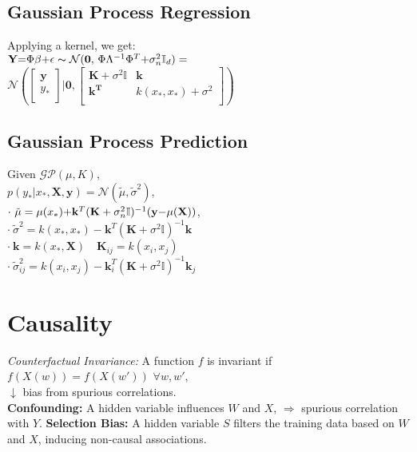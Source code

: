 \subsection*{Gaussian Process Regression}
Applying a kernel, we get: \\
$\mathbf{Y} {=} \Phi \mathbb{\beta} {+} \mathbb{\epsilon} \thicksim \mathcal{N}(\mathbf{0},\,\Phi \Lambda^{-1}\Phi^T {+} \sigma_n^2\mathbb{I}_{d}) = $
$\mathcal{N}(\begin{bmatrix}
\mathbf{y}\\
y_*\\
\end{bmatrix}|\mathbf{0},\begin{bmatrix}
    \mathbf{K}+\sigma^2\mathbb{I} & \mathbf{k} \\
    \mathbf{k^T} & k(x_*,x_*) + \sigma^2\\
\end{bmatrix})$\\

\subsection*{Gaussian Process Prediction}
Given $\mathcal{GP}(\mu, K)$, \\
$p(y_*|x_*,\mathbf{X},\mathbf{y}) = \mathcal{N}(\tilde \mu, \tilde \sigma^2)$,\\
$\cdot \ \tilde\mu = \mu(x_*) {+} \mathbf{k}^T(\mathbf{K}+\sigma_n^2\mathbb{I})^{-1}(\mathbf{y} {-} \mu(\mathbf{X}))$,\\
$\cdot \ \tilde\sigma^2 = k(x_*,x_*) - \mathbf{k}^T(\mathbf{K}+\sigma^2\mathbb{I})^{-1}\mathbf{k}$\\
$\cdot \ \mathbf{k}=k(x_*,\mathbf{X})\quad \mathbf{K}_{ij}=k(x_i,x_j)$ \\
$\cdot \ \tilde\sigma^2_{ij} = k(x_i,x_j) - \mathbf{k}^T_i(\mathbf{K}+\sigma^2\mathbb{I})^{-1}\mathbf{k}_j$\\

\section*{Causality}
\textit{Counterfactual Invariance:} A function $f$ is invariant if $f(X(w)) = f(X(w'))$  $\forall w, w'$, \\$\downarrow$ bias from spurious correlations. \\
\textbf{Confounding:} A hidden variable influences $W$ and $X$, ${\Rightarrow}$ spurious correlation with $Y$.
\textbf{Selection Bias:} A hidden variable $S$ filters the training data based on $W$ and $X$, inducing non-causal associations.

